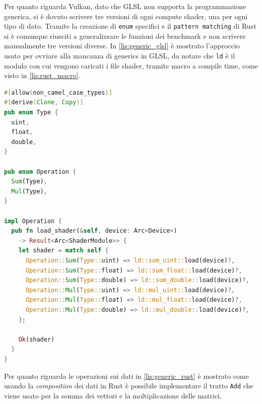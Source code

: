 Per quanto riguarda Vulkan, dato che GLSL non supporta la programmazione generica, si è dovuto scrivere tre versioni di ogni compute shader, una per ogni tipo di dato. Tramite la creazione di \verb|enum| specifici e il \verb|pattern matching| di Rust si è comunque riusciti a generalizzare le funzioni dei benchmark e non scrivere manualmente tre versioni diverse. In \ref{lis:generic_glsl} è mostrato l'approccio usato per ovviare alla mancanza di generics in GLSL, da notare che \verb|ld| è il modulo con cui vengono caricati i file shader, tramite macro a compile time, come visto in \ref{lis:rust_macro}.

\vspace{5mm}
\begin{lstlisting}[language=Rust, caption=Loading shader con generics, label=lis:generic_glsl]
#[allow(non_camel_case_types)]
#[derive(Clone, Copy)]
pub enum Type {
  uint,
  float,
  double,
}

pub enum Operation {
  Sum(Type),
  Mul(Type),
}

impl Operation {
  pub fn load_shader(&self, device: Arc<Device>)
    -> Result<Arc<ShaderModule>> {
    let shader = match self {
      Operation::Sum(Type::uint) => ld::sum_uint::load(device)?,
      Operation::Sum(Type::float) => ld::sum_float::load(device)?,
      Operation::Sum(Type::double) => ld::sum_double::load(device)?,
      Operation::Mul(Type::uint) => ld::mul_uint::load(device)?,
      Operation::Mul(Type::float) => ld::mul_float::load(device)?,
      Operation::Mul(Type::double) => ld::mul_double::load(device)?,
    };

    Ok(shader)
  }
}
\end{lstlisting}
\vspace{5mm}

Per quanto riguarda le operazioni sui dati in \ref{lis:generic_rust} è mostrato come usando la \textit{composition} dei dati in Rust è possibile implementare il tratto \verb|Add| che viene usato per la somma dei vettori e la moltiplicazione delle matrici.

